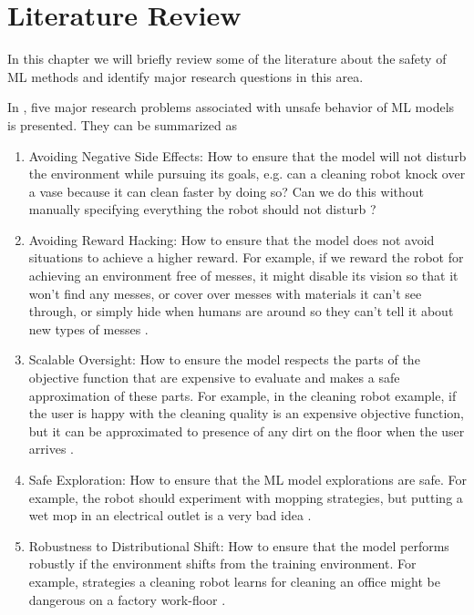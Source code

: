 \chapter{Literature Review}
\label{chap:literature}

In this chapter we will briefly review some of the literature about the safety of ML methods and identify major research questions in this area. 

In \cite{Amodei}, five major research problems associated with unsafe behavior of ML models is presented. They can be summarized as
\begin{enumerate}
	\item Avoiding Negative Side Effects: How to ensure that the model will not disturb the environment while pursuing its goals, e.g. can a cleaning robot knock over a vase because it can clean faster by doing so? Can we do this without manually specifying everything the robot should not disturb \cite{Amodei}?
	
	\item Avoiding Reward Hacking: How to ensure that the model does not avoid situations to achieve a higher reward. For example, if we reward the robot for achieving an environment free of messes, it might disable its vision so that it won’t find any messes, or cover over messes with materials it can’t see through, or simply hide when humans are around so they can’t tell it about new types of messes \cite{Amodei}. 
	
	\item Scalable Oversight: How to ensure the model respects the parts of the objective function that are expensive to evaluate and makes a safe approximation of these parts. 
	For example, in the cleaning robot example, if the user is happy with the cleaning quality is an expensive objective function, but it can be approximated to presence of any dirt on the floor when the user arrives \cite{Amodei}. 
	
	\item Safe Exploration: How to ensure that the ML model explorations are safe. For example, the robot should experiment with mopping strategies, but putting a wet mop in an electrical outlet is a very bad idea \cite{Amodei}. 
	
	\item Robustness to Distributional Shift: How to ensure that the model performs robustly if the environment shifts from the training environment. For example, strategies a cleaning robot learns for cleaning an office might be dangerous on a factory work-floor \cite{Amodei}.

\end{enumerate}

